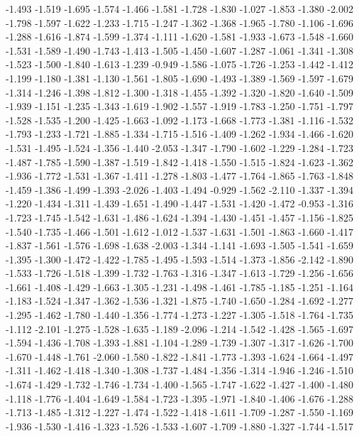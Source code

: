 \documentclass[9pt]{article}
\theoremstyle{plain}
\theoremstyle{definition}
\theoremstyle{remark}
\numberwithin{equation}{section}
\begin{document}
-1.493
-1.519
-1.695
-1.574
-1.466
-1.581
-1.728
-1.830
-1.027
-1.853
-1.380
-2.002
-1.798
-1.597
-1.622
-1.233
-1.715
-1.247
-1.362
-1.368
-1.965
-1.780
-1.106
-1.696
-1.288
-1.616
-1.874
-1.599
-1.374
-1.111
-1.620
-1.581
-1.933
-1.673
-1.548
-1.660
-1.531
-1.589
-1.490
-1.743
-1.413
-1.505
-1.450
-1.607
-1.287
-1.061
-1.341
-1.308
-1.523
-1.500
-1.840
-1.613
-1.239
-0.949
-1.586
-1.075
-1.726
-1.253
-1.442
-1.412
-1.199
-1.180
-1.381
-1.130
-1.561
-1.805
-1.690
-1.493
-1.389
-1.569
-1.597
-1.679
-1.314
-1.246
-1.398
-1.812
-1.300
-1.318
-1.455
-1.392
-1.320
-1.820
-1.640
-1.509
-1.939
-1.151
-1.235
-1.343
-1.619
-1.902
-1.557
-1.919
-1.783
-1.250
-1.751
-1.797
-1.528
-1.535
-1.200
-1.425
-1.663
-1.092
-1.173
-1.668
-1.773
-1.381
-1.116
-1.532
-1.793
-1.233
-1.721
-1.885
-1.334
-1.715
-1.516
-1.409
-1.262
-1.934
-1.466
-1.620
-1.531
-1.495
-1.524
-1.356
-1.440
-2.053
-1.347
-1.790
-1.602
-1.229
-1.284
-1.723
-1.487
-1.785
-1.590
-1.387
-1.519
-1.842
-1.418
-1.550
-1.515
-1.824
-1.623
-1.362
-1.936
-1.772
-1.531
-1.367
-1.411
-1.278
-1.803
-1.477
-1.764
-1.865
-1.763
-1.848
-1.459
-1.386
-1.499
-1.393
-2.026
-1.403
-1.494
-0.929
-1.562
-2.110
-1.337
-1.394
-1.220
-1.434
-1.311
-1.439
-1.651
-1.490
-1.447
-1.531
-1.420
-1.472
-0.953
-1.316
-1.723
-1.745
-1.542
-1.631
-1.486
-1.624
-1.394
-1.430
-1.451
-1.457
-1.156
-1.825
-1.540
-1.735
-1.466
-1.501
-1.612
-1.012
-1.537
-1.631
-1.501
-1.863
-1.660
-1.417
-1.837
-1.561
-1.576
-1.698
-1.638
-2.003
-1.344
-1.141
-1.693
-1.505
-1.541
-1.659
-1.395
-1.300
-1.472
-1.422
-1.785
-1.495
-1.593
-1.514
-1.373
-1.856
-2.142
-1.890
-1.533
-1.726
-1.518
-1.399
-1.732
-1.763
-1.316
-1.347
-1.613
-1.729
-1.256
-1.656
-1.661
-1.408
-1.429
-1.663
-1.305
-1.231
-1.498
-1.461
-1.785
-1.185
-1.251
-1.164
-1.183
-1.524
-1.347
-1.362
-1.536
-1.321
-1.875
-1.740
-1.650
-1.284
-1.692
-1.277
-1.295
-1.462
-1.780
-1.440
-1.356
-1.774
-1.273
-1.227
-1.305
-1.518
-1.764
-1.735
-1.112
-2.101
-1.275
-1.528
-1.635
-1.189
-2.096
-1.214
-1.542
-1.428
-1.565
-1.697
-1.594
-1.436
-1.708
-1.393
-1.881
-1.104
-1.289
-1.739
-1.307
-1.317
-1.626
-1.700
-1.670
-1.448
-1.761
-2.060
-1.580
-1.822
-1.841
-1.773
-1.393
-1.624
-1.664
-1.497
-1.311
-1.462
-1.418
-1.340
-1.308
-1.737
-1.484
-1.356
-1.314
-1.946
-1.246
-1.510
-1.674
-1.429
-1.732
-1.746
-1.734
-1.400
-1.565
-1.747
-1.622
-1.427
-1.400
-1.480
-1.118
-1.776
-1.404
-1.649
-1.584
-1.723
-1.395
-1.971
-1.840
-1.406
-1.676
-1.288
-1.713
-1.485
-1.312
-1.227
-1.474
-1.522
-1.418
-1.611
-1.709
-1.287
-1.550
-1.169
-1.936
-1.530
-1.416
-1.323
-1.526
-1.533
-1.607
-1.709
-1.880
-1.327
-1.744
-1.517
\end{document}
